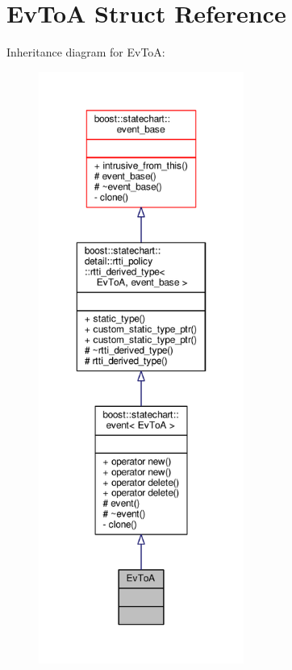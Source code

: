 \hypertarget{struct_ev_to_a}{}\section{Ev\+ToA Struct Reference}
\label{struct_ev_to_a}


Inheritance diagram for Ev\+ToA\+:
\nopagebreak
\begin{figure}[H]
\begin{center}
\leavevmode
\includegraphics[height=550pt]{struct_ev_to_a__inherit__graph}
\end{center}
\end{figure}


